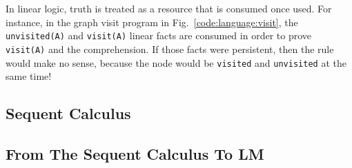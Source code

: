 In linear logic, truth is treated as a resource that is consumed once used. For
instance, in the graph visit program in Fig.~\ref{code:language:visit}, the
\texttt{unvisited(A)} and \texttt{visit(A)} linear facts are consumed in order
to prove \texttt{visit(A)} and the comprehension. If those facts were
persistent, then the rule would make no sense, because the node would be
\texttt{visited} and \texttt{unvisited} at the same time!

\subsection{Sequent Calculus}



\subsection{From The Sequent Calculus To LM}

